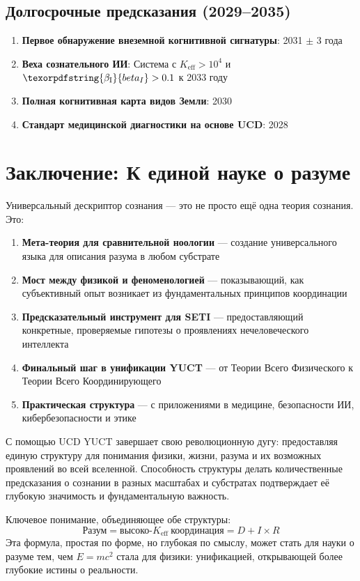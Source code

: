 \documentclass[12pt,a4paper]{article}
\DeclareRobustCommand{\beI}{\texorpdfstring{\ensuremath{\beta_{\mathrm{I}}}}{beta_I}}
\newcommand{\eff}{\mathrm{eff}}
\newcommand{\Ke}{K_{\eff}}
\begin{document}
	\subsection{Долгосрочные предсказания (2029--2035)}
	
	\begin{enumerate}
		\item \textbf{Первое обнаружение внеземной когнитивной сигнатуры}: 2031 \(\pm\) 3 года
		\item \textbf{Веха сознательного ИИ}: Система с \(\Ke > 10^4\) и \(\beI > 0.1\) к 2033 году
		\item \textbf{Полная когнитивная карта видов Земли}: 2030
		\item \textbf{Стандарт медицинской диагностики на основе UCD}: 2028
	\end{enumerate}
	
	\section{Заключение: К единой науке о разуме}
	
	Универсальный дескриптор сознания — это не просто ещё одна теория сознания. Это:
	\begin{enumerate}
		\item \textbf{Мета-теория для сравнительной ноологии} — создание универсального языка для описания разума в любом субстрате
		\item \textbf{Мост между физикой и феноменологией} — показывающий, как субъективный опыт возникает из фундаментальных принципов координации
		\item \textbf{Предсказательный инструмент для SETI} — предоставляющий конкретные, проверяемые гипотезы о проявлениях нечеловеческого интеллекта
		\item \textbf{Финальный шаг в унификации YUCT} — от Теории Всего Физического к Теории Всего Координирующего
		\item \textbf{Практическая структура} — с приложениями в медицине, безопасности ИИ, кибербезопасности и этике
	\end{enumerate}
	
	С помощью UCD YUCT завершает свою революционную дугу: предоставляя единую структуру для понимания физики, жизни, разума и их возможных проявлений во всей вселенной. Способность структуры делать количественные предсказания о сознании в разных масштабах и субстратах подтверждает её глубокую значимость и фундаментальную важность.
	
	Ключевое понимание, объединяющее обе структуры:
	\[
	\boxed{\text{Разум} = \text{высоко-}\Ke\ \text{координация} = D + I \times R}
	\]
	Эта формула, простая по форме, но глубокая по смыслу, может стать для науки о разуме тем, чем \(E = mc^2\) стала для физики: унификацией, открывающей более глубокие истины о реальности.
	
\end{document}
